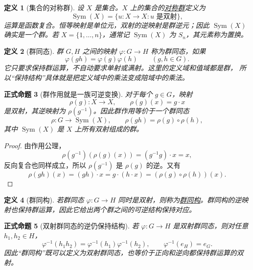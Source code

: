 \documentclass[UTF8,fontset=none,a4paper,11pt]{ctexart}
\theoremstyle{foundation-definition}
\newtheorem{definition}{定义}[section]
\theoremstyle{foundation-theorem}
\theoremstyle{foundation-proposition}
\newtheorem{proposition}[definition]{正式命题}
\theoremstyle{foundation-example}
\theoremstyle{foundation-remark}
\theoremstyle{foundation-theorem}
\newcommand{\term}[2]{\hyperref[#1]{#2}}
\begin{document}
\begin{definition}[集合的对称群]\label{def:sym-group-general}
设 \(X\) 是集合。\(X\) 上的集合的\term{def:sym-group-general}{对称群}定义为
\[
\operatorname{Sym}(X)=\{u:X\to X:u\text{ 是双射}\},
\]
运算是函数复合。恒等映射是单位元，双射的逆映射是群逆元；因此
\(\operatorname{Sym}(X)\) 确实是一个群。若 \(X=\{1,\dots,n\}\)，通常记
\(\operatorname{Sym}(X)\) 为 \(S_n\)，其元素称为置换。
\end{definition}

\begin{definition}[群同态]\label{def:group-hom}
群 \(G,H\) 之间的映射 \(\varphi:G\to H\) 称为群同态，如果
\[
\varphi(gh)=\varphi(g)\varphi(h)\qquad(g,h\in G).
\]
它只要求保持群运算，不自动要求单射或满射。这里的定义域和值域都是群，
所以“保持结构”具体就是把定义域中的乘法变成陪域中的乘法。
\end{definition}

\begin{proposition}[群作用就是一族可逆变换]\label{prop:group-action-as-hom}
对于每个 \(g\in G\)，映射
\[
\rho(g):X\longrightarrow X,\qquad \rho(g)(x)=g\cdot x
\]
是双射，其逆映射为 \(\rho(g^{-1})\)。因此群作用等价于一个群同态
\[
\rho:G\longrightarrow \operatorname{Sym}(X),
\qquad
\rho(gh)=\rho(g)\circ\rho(h),
\]
其中 \(\operatorname{Sym}(X)\) 是 \(X\) 上所有双射组成的群。
\end{proposition}

\begin{proof}
由作用公理，
\[
\rho(g^{-1})(\rho(g)(x))=(g^{-1}g)\cdot x=x,
\]
反向复合也同样成立，所以 \(\rho(g^{-1})\) 是 \(\rho(g)\) 的逆。又有
\[
\rho(gh)(x)=(gh)\cdot x=g\cdot(h\cdot x)
=(\rho(g)\circ\rho(h))(x).
\]
\end{proof}

\begin{definition}[群同构]\label{def:group-isomorphism}
若群同态 \(\varphi:G\to H\) 同时是双射，则称为\term{def:group-isomorphism}{群同构}。群同构的逆映射也保持群运算，因此它给出两个群之间的可逆结构保持对应。
\end{definition}

\begin{proposition}[双射群同态的逆仍保持结构]\label{prop:bijective-group-hom-inverse}
若 \(\varphi:G\to H\) 是双射群同态，则对任意 \(h_1,h_2\in H\)，
\[
\varphi^{-1}(h_1h_2)
=\varphi^{-1}(h_1)\varphi^{-1}(h_2),
\qquad
\varphi^{-1}(e_H)=e_G.
\]
因此“群同构”既可以定义为双射群同态，也等价于正向和逆向都保持群运算的双射。
\end{proposition}
\end{document}
